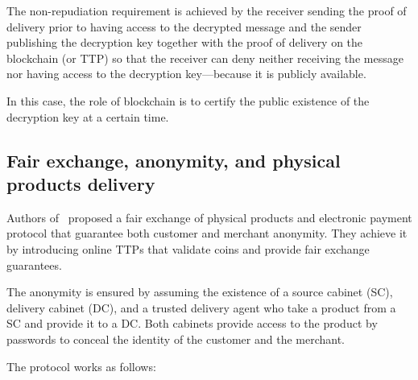 \documentclass{ieeeaccess}
\begin{document}
The non-repudiation requirement is achieved by the receiver sending the proof of delivery prior to having access to the decrypted message and the sender publishing the decryption key together with the proof of delivery on the blockchain (or TTP) so that the receiver can deny neither receiving the message nor having access to the decryption key—because it is publicly available.

In this case, the role of blockchain is to certify the public existence of the decryption key at a certain time.

\subsection{Fair exchange, anonymity, and physical products delivery} 
\label{anonymity-and-fair-exchange-in-e-commerce-protocol-for-physical-products-delivery}

Authors of~\cite{birjoveanu2015anonymity} proposed a
fair exchange of physical products and electronic payment protocol that
guarantee both customer and merchant anonymity. They achieve it by introducing online TTPs that validate coins and provide
fair exchange guarantees.

The anonymity is ensured by assuming the existence of a source cabinet (SC), delivery cabinet (DC), and a trusted delivery agent who take a product from a SC and provide it to a DC.
Both cabinets provide access to the product by passwords to conceal
the identity of the customer and the merchant.

The protocol works as follows: \begingroup
\renewcommand{\labelenumii}{\arabic{enumii}.}
\end{document}
